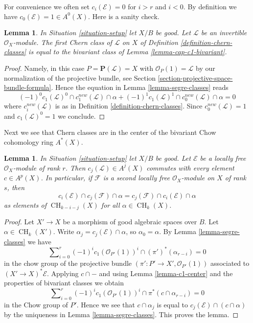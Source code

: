 \documentclass{stacks-project}
\theoremstyle{plain}
\newtheorem{lemma}[subsection]{Lemma}
\theoremstyle{definition}
\theoremstyle{remark}
\numberwithin{equation}{subsection}
\def\CH{\mathop{\mathrm{CH}}\nolimits}
\begin{document}
\noindent
For convenience we often set $c_i(\mathcal{E}) = 0$
for $i > r$ and $i < 0$. By definition
we have $c_0(\mathcal{E}) = 1 \in A^0(X)$.
Here is a sanity check.

\begin{lemma}
\label{lemma-first-chern-class}
In Situation \ref{situation-setup} let $X/B$ be good.
Let $\mathcal{L}$ be an invertible $\mathcal{O}_X$-module.
The first Chern class of $\mathcal{L}$ on $X$ of
Definition \ref{definition-chern-classes}
is equal to the bivariant class of Lemma \ref{lemma-cap-c1-bivariant}.
\end{lemma}

\begin{proof}
Namely, in this case $P = \mathbf{P}(\mathcal{L}) = X$ with
$\mathcal{O}_P(1) = \mathcal{L}$ by our normalization of the
projective bundle, see Section \ref{section-projective-space-bundle-formula}.
Hence the equation in Lemma \ref{lemma-segre-classes}
reads
$$
(-1)^0 c_1(\mathcal{L})^0 \cap c^{new}_1(\mathcal{L}) \cap \alpha +
(-1)^1 c_1(\mathcal{L})^1 \cap c^{new}_0(\mathcal{L}) \cap \alpha = 0
$$
where $c_i^{new}(\mathcal{L})$ is as in
Definition \ref{definition-chern-classes}.
Since $c_0^{new}(\mathcal{L}) = 1$ and $c_1(\mathcal{L})^0 = 1$
we conclude.
\end{proof}

\noindent
Next we see that Chern classes are in the center of the bivariant
Chow cohomology ring $A^*(X)$.

\begin{lemma}
\label{lemma-cap-commutative-chern}
In Situation \ref{situation-setup} let $X/B$ be good.
Let $\mathcal{E}$ be a locally free $\mathcal{O}_X$-module of rank $r$.
Then $c_j(\mathcal{L}) \in A^j(X)$ commutes with every
element $c \in A^p(X)$. In particular, if $\mathcal{F}$ is a
second locally free $\mathcal{O}_X$-module on $X$ of rank $s$, then
$$
c_i(\mathcal{E}) \cap c_j(\mathcal{F}) \cap \alpha
=
c_j(\mathcal{F}) \cap c_i(\mathcal{E}) \cap \alpha
$$
as elements of $\CH_{k - i - j}(X)$ for all $\alpha \in \CH_k(X)$.
\end{lemma}

\begin{proof}
Let $X' \to X$ be a morphism of good algebraic spaces over $B$.
Let $\alpha \in \CH_k(X')$. Write $\alpha_j = c_j(\mathcal{E}) \cap \alpha$, so
$\alpha_0 = \alpha$. By Lemma \ref{lemma-segre-classes} we have
$$
\sum\nolimits_{i = 0}^r
(-1)^i c_1(\mathcal{O}_{P'}(1))^i \cap
(\pi')^*(\alpha_{r - i}) = 0
$$
in the chow group of the projective bundle
$(\pi' : P' \to X', \mathcal{O}_{P'}(1))$
associated to $(X' \to X)^*\mathcal{E}$.
Applying $c \cap -$ and using Lemma \ref{lemma-c1-center}
and the properties of bivariant classes we obtain
$$
\sum\nolimits_{i = 0}^r
(-1)^i c_1(\mathcal{O}_{P'}(1))^i \cap
\pi^*(c \cap \alpha_{r - i}) = 0
$$
in the Chow group of $P'$. Hence we see that $c \cap \alpha_j$ is
equal to $c_j(\mathcal{E}) \cap (c \cap \alpha)$ by the uniqueness in
Lemma \ref{lemma-segre-classes}. This proves the lemma.
\end{proof}
\end{document}
